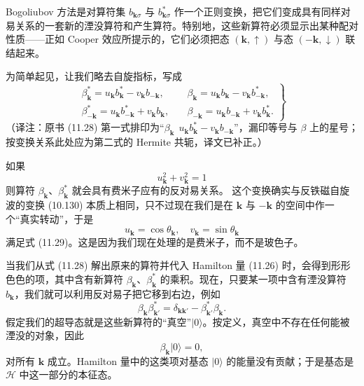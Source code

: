 Bogoliubov 方法是对算符集 $b_{\mathbf{k}\sigma}$ 与 $b^{*}_{\mathbf{k}\sigma}$ 作一个正则变换，把它们变成具有同样对易关系的一套新的湮没算符和产生算符。特别地，这些新算符必须显示出某种配对性质——正如 Cooper 效应所提示的，它们必须把态 $(\mathbf{k},\uparrow)$ 与态 $(-\mathbf{k},\downarrow)$ 联结起来。

为简单起见，让我们略去自旋指标，写成
\begin{equation*}
\left.\begin{array}{ll}
\beta^{*}_{\mathbf{k}}=u_{\mathbf{k}}b^{*}_{\mathbf{k}}-v_{\mathbf{k}}b_{-\mathbf{k}}, &\quad \beta_{\mathbf{k}}=u_{\mathbf{k}}b_{\mathbf{k}}-v_{\mathbf{k}}b^{*}_{-\mathbf{k}},\\
\beta^{*}_{-\mathbf{k}}=u_{\mathbf{k}}b^{*}_{-\mathbf{k}}+v_{\mathbf{k}}b_{\mathbf{k}}, &\quad \beta_{-\mathbf{k}}=u_{\mathbf{k}}b_{-\mathbf{k}}+v_{\mathbf{k}}b^{*}_{\mathbf{k}}.
\end{array}\right\}
\tag{11.28}
\end{equation*}
（译注：原书 (11.28) 第一式排印为“$\beta_{\mathbf{k}}\ \ u_{\mathbf{k}}b^{*}_{\mathbf{k}}-v_{\mathbf{k}}b_{-\mathbf{k}}$”，漏印等号与 $\beta$ 上的星号；按变换关系此处应为第二式的 Hermite 共轭，译文已补正。）

如果
\begin{equation*}
u^{2}_{\mathbf{k}}+v^{2}_{\mathbf{k}}=1
\tag{11.29}
\end{equation*}
则算符 $\beta_{\mathbf{k}}$、$\beta^{*}_{\mathbf{k}}$ 就会具有费米子应有的反对易关系。
这个变换确实与反铁磁自旋波的变换 (10.130) 本质上相同，只不过现在我们是在 $\mathbf{k}$ 与 $-\mathbf{k}$ 的空间中作一个“真实转动”，于是
\begin{equation*}
u_{\mathbf{k}}=\cos\theta_{\mathbf{k}},\quad v_{\mathbf{k}}=\sin\theta_{\mathbf{k}}
\tag{11.30}
\end{equation*}
满足式 (11.29)。这是因为我们现在处理的是费米子，而不是玻色子。

当我们从式 (11.28) 解出原来的算符并代入 Hamilton 量 (11.26) 时，会得到形形色色的项，其中含有新算符 $\beta_{\mathbf{k}}$、$\beta^{*}_{\mathbf{k}}$ 的乘积。现在，只要某一项中含有湮没算符 $b_{\mathbf{k}}$，我们就可以利用反对易子把它移到右边，例如
\begin{equation*}
\beta_{\mathbf{k}}\beta^{*}_{\mathbf{k}'}=\delta_{\mathbf{k}\mathbf{k}'}-\beta^{*}_{\mathbf{k}'}\beta_{\mathbf{k}}.
\tag{11.31}
\end{equation*}
假定我们的超导态就是这些新算符的“真空”$|0\rangle$。按定义，真空中不存在任何能被湮没的对象，因此
\begin{equation*}
\beta_{\mathbf{k}}|0\rangle=0,
\tag{11.32}
\end{equation*}
对所有 $\mathbf{k}$ 成立。Hamilton 量中的这类项对基态 $|0\rangle$ 的能量没有贡献；于是基态是 $\mathcal{H}$ 中这一部分的本征态。

